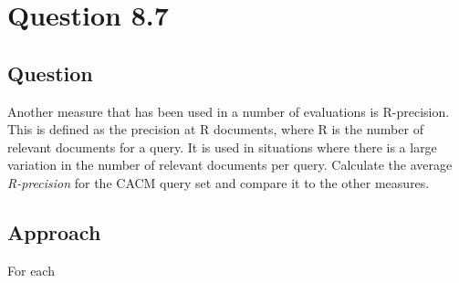 \section{Question 8.7}

\subsection{Question}
Another measure that has been used in a number of evaluations is R-precision.  This is defined as the precision at R documents, where R is the number of relevant documents for a query. It is used in situations where there is a large variation in the number of relevant documents per query. Calculate the average \textit{R-precision} for the CACM query set and compare it to the other measures.

\subsection{Approach}
For each